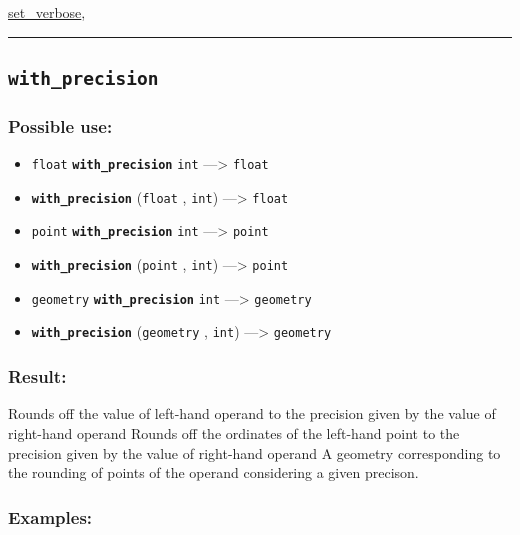 \documentclass[]{book}
\providecommand{\tightlist}{%
  \setlength{\itemsep}{0pt}\setlength{\parskip}{0pt}}
\theoremstyle{definition}
\theoremstyle{definition}
\theoremstyle{definition}
\theoremstyle{remark}
\begin{document}
\href{operators-s-to-z.html\#set_verbose}{set\_verbose},

\begin{center}\rule{0.5\linewidth}{\linethickness}\end{center}

\subsection{\texorpdfstring{\texttt{with\_precision}}{with\_precision}}\label{with_precision}

\subsubsection{Possible use:}\label{possible-use-560}

\begin{itemize}
\tightlist
\item
  \texttt{float} \textbf{\texttt{with\_precision}} \texttt{int}
  ---\textgreater{} \texttt{float}
\item
  \textbf{\texttt{with\_precision}} (\texttt{float} , \texttt{int})
  ---\textgreater{} \texttt{float}
\item
  \texttt{point} \textbf{\texttt{with\_precision}} \texttt{int}
  ---\textgreater{} \texttt{point}
\item
  \textbf{\texttt{with\_precision}} (\texttt{point} , \texttt{int})
  ---\textgreater{} \texttt{point}
\item
  \texttt{geometry} \textbf{\texttt{with\_precision}} \texttt{int}
  ---\textgreater{} \texttt{geometry}
\item
  \textbf{\texttt{with\_precision}} (\texttt{geometry} , \texttt{int})
  ---\textgreater{} \texttt{geometry}
\end{itemize}

\subsubsection{Result:}\label{result-539}

Rounds off the value of left-hand operand to the precision given by the
value of right-hand operand Rounds off the ordinates of the left-hand
point to the precision given by the value of right-hand operand A
geometry corresponding to the rounding of points of the operand
considering a given precison.

\subsubsection{Examples:}\label{examples-387}
\end{document}
